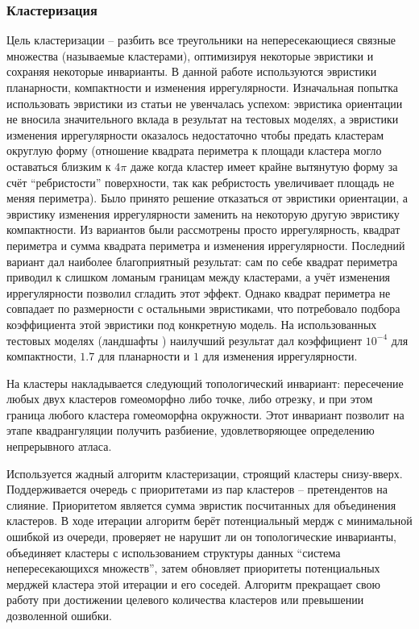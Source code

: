 \documentclass{article}
\begin{document}
\subsubsection{Кластеризация}
Цель кластеризации -- разбить все треугольники на непересекающиеся связные множества (называемые кластерами), оптимизируя некоторые эвристики и сохраняя некоторые инварианты. В данной работе используются эвристики планарности, компактности и изменения иррегулярности. Изначальная попытка использовать эвристики из статьи \cite{garland2001} не увенчалась успехом: эвристика ориентации не вносила значительного вклада в результат на тестовых моделях, а эвристики изменения иррегулярности оказалось недостаточно чтобы предать кластерам округлую форму (отношение квадрата периметра к площади кластера могло оставаться близким к $4\pi$ даже когда кластер имеет крайне вытянутую форму за счёт ``ребристости'' поверхности, так как ребристость увеличивает площадь не меняя периметра). Было принято решение отказаться от эвристики ориентации, а эвристику изменения иррегулярности заменить на некоторую другую эвристику компактности. Из вариантов были рассмотрены просто иррегулярность, квадрат периметра и сумма квадрата периметра и изменения иррегулярности. Последний вариант дал наиболее благоприятный результат: сам по себе квадрат периметра приводил к слишком ломаным границам между кластерами, а учёт изменения иррегулярности позволил сгладить этот эффект. Однако квадрат периметра не совпадает по размерности с остальными эвристиками, что потребовало подбора коэффициента этой эвристики под конкретную модель. На использованных тестовых моделях (ландшафты \cite{quixel_megascans}) наилучший результат дал коэффициент $10^{-4}$ для компактности, $1.7$ для планарности и $1$ для изменения иррегулярности.

На кластеры накладывается следующий топологический инвариант: пересечение любых двух кластеров гомеоморфно либо точке, либо отрезку, и при этом граница любого кластера гомеоморфна окружности. Этот инвариант позволит на этапе квадрангуляции получить разбиение, удовлетворяющее определению непрерывного атласа.

Используется жадный алгоритм кластеризации, строящий кластеры снизу-вверх. Поддерживается очередь с приоритетами из пар кластеров -- претендентов на слияние. Приоритетом является сумма эвристик посчитанных для объединения кластеров. В ходе итерации алгоритм берёт потенциальный мердж с минимальной ошибкой из очереди, проверяет не нарушит ли он топологические инварианты, объединяет кластеры с использованием структуры данных ``система непересекающихся множеств'', затем обновляет приоритеты потенциальных мерджей кластера этой итерации и его соседей. Алгоритм прекращает свою работу при достижении целевого количества кластеров или превышении дозволенной ошибки.
\end{document}
